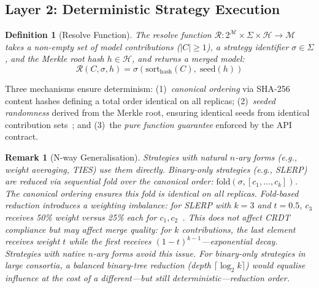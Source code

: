 \documentclass[10pt,letterpaper]{article}
\newtheorem{definition}[theorem]{Definition}
\newtheorem{remark}[theorem]{Remark}
\begin{document}
\subsection{Layer 2: Deterministic Strategy Execution}\label{sec:layer2}

\begin{definition}[Resolve Function]\label{def:resolve}
The resolve function $\mathcal{R} : 2^{\mathcal{M}} \times \Sigma \times \mathcal{H} \to \mathcal{M}$ takes a non-empty set of model contributions ($|C| \geq 1$), a strategy identifier $\sigma \in \Sigma$, and the Merkle root hash $h \in \mathcal{H}$, and returns a merged model:
\begin{equation}\label{eq:resolve}
\mathcal{R}(C, \sigma, h) = \sigma(\mathrm{sort}_{\mathrm{hash}}(C),\; \mathrm{seed}(h))
\end{equation}
\end{definition}

Three mechanisms ensure determinism: (1)~\emph{canonical ordering} via SHA-256 content hashes defining a total order identical on all replicas; (2)~\emph{seeded randomness} derived from the Merkle root, ensuring identical seeds from identical contribution sets~\cite{sanjuan2020merkle}; and (3)~the \emph{pure function guarantee} enforced by the API contract.

\begin{remark}[N-way Generalisation]\label{rem:nway}
Strategies with natural $n$-ary forms (e.g., weight averaging, TIES) use them directly.
Binary-only strategies (e.g., SLERP) are reduced via sequential fold over the canonical order: $\mathrm{fold}(\sigma, [c_1, \ldots, c_k])$.
The canonical ordering ensures this fold is identical on all replicas.
Fold-based reduction introduces a weighting imbalance: for SLERP with $k=3$ and $t=0.5$, $c_3$ receives 50\% weight versus 25\% each for $c_1, c_2$~\cite{shoemake1985animating}.
This does not affect CRDT compliance but may affect merge quality: for $k$ contributions, the last element receives weight $t$ while the first receives $(1{-}t)^{k-1}$---exponential decay.
Strategies with native $n$-ary forms avoid this issue.
For binary-only strategies in large consortia, a balanced binary-tree reduction (depth $\lceil\log_2 k\rceil$) would equalise influence at the cost of a different---but still deterministic---reduction order.
\end{remark}

\end{document}
